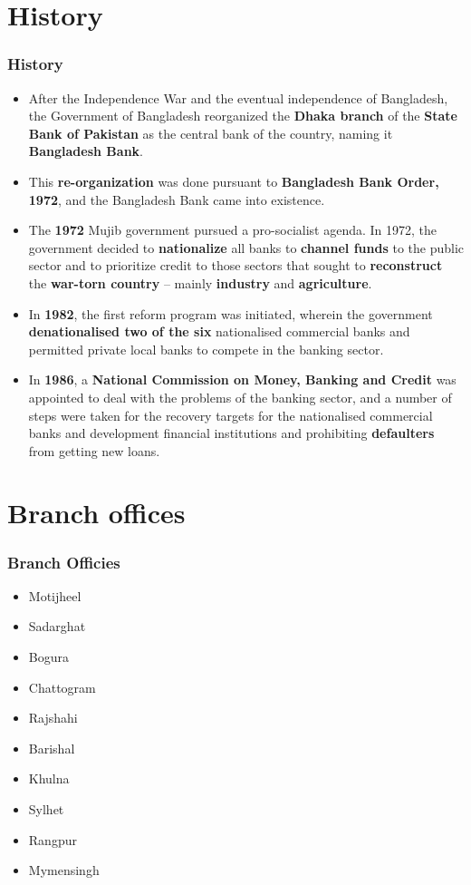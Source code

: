 \documentclass[usenames,dvipsnames]{beamer}
\begin{document}
\section{History}
\begin{frame}[allowframebreaks]
\frametitle{History}
\begin{itemize}
\item After the Independence War and the eventual independence of Bangladesh, the Government of Bangladesh reorganized the \textbf{Dhaka branch} of the \textbf{State Bank of Pakistan} as the central bank of the country, naming it \textbf{Bangladesh Bank}.
\item This \textbf{re-organization} was done pursuant to \textbf{Bangladesh Bank Order, 1972}, and the Bangladesh Bank came into existence.
\item The \textbf{1972} Mujib government pursued a pro-socialist agenda. In 1972, the government decided to \textbf{nationalize} all banks to \textbf{channel funds} to the public sector and to prioritize credit to those sectors that sought to \textbf{reconstruct} the \textbf{war-torn country} – mainly \textbf{industry} and \textbf{agriculture}.
\item In \textbf{1982}, the first reform program was initiated, wherein the government \textbf{denationalised two of the six} nationalised commercial banks and permitted private local banks to compete in the banking sector.
\item In \textbf{1986}, a \textbf{National Commission on Money, Banking and Credit} was appointed to deal with the problems of the banking sector, and a number of steps were taken for the recovery targets for the nationalised commercial banks and development financial institutions and prohibiting \textbf{defaulters} from getting new loans.
\end{itemize}
\end{frame}

\section{Branch offices}
\begin{frame}
\frametitle{Branch Officies}
\begin{multicols}{2}
\begin{itemize}
\item Motijheel
\item Sadarghat
\item Bogura
\item Chattogram
\item Rajshahi
\item Barishal
\item Khulna
\item Sylhet
\item Rangpur
\item Mymensingh
\end{itemize}
\end{multicols}

\end{frame}
\end{document}
